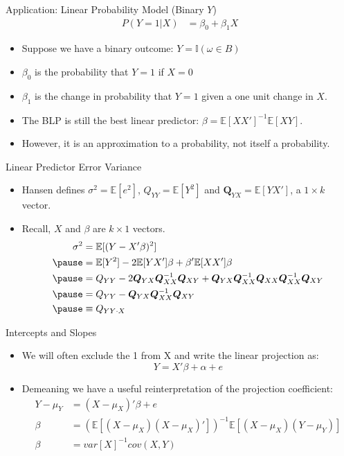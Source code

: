 \documentclass[aspectratio=169, handout, t]{beamer}
\numberwithin{equation}{section}
\begin{document}
\begin{frame}{Application: Linear Probability Model (Binary $Y$)}
\begin{align*}
P(Y=1|X)&=\beta_0+\beta_1X
\end{align*}
\begin{itemize}
\item Suppose we have a binary outcome: $Y=\mathbb{I}(\omega\in B)$
\item $\beta_0$ is the probability that $Y=1$ if $X=0$
\item $\beta_1$ is the change in probability that $Y=1$ given a one unit change in $X$.
\item The BLP is still the best linear predictor: $\beta=\mathbb{E}[XX']^{-1}\mathbb{E}[XY]$.
\item However, it is an approximation to a probability, not itself a probability.
\end{itemize}
\end{frame}


\begin{frame}{Linear Predictor Error Variance}
\begin{itemize}
\item Hansen defines $\sigma^2=\mathbb{E}[e^2]$, $Q_{YY}=\mathbb{E}[Y^2]$ and $\mathbf{Q}_{YX}=\mathbb{E}[YX']$, a $1\times k$ vector.
\item Recall, $X$ and  $\beta$ are $k\times 1$ vectors.
\begin{align*}
\sigma^2&=\mathbb{E}[(Y-X'\beta)^2]\\ \pause
&=\mathbb{E}[Y^2]-2\mathbb{E}[YX']\beta+\beta'\mathbb{E}[XX']\beta\\\pause
&=Q_{YY}-2\bm{Q}_{YX}\bm{Q}^{-1}_{XX}\bm{Q}_{XY}+\bm{Q}_{YX}\bm{Q}^{-1}_{XX}\bm{Q}_{XX}\bm{Q}^{-1}_{XX}\bm{Q}_{XY}\\\pause
&=Q_{YY}-\bm{Q}_{YX}\bm{Q}^{-1}_{XX}\bm{Q}_{XY}\\\pause
&\equiv Q_{YY\cdot X}
\end{align*}
\end{itemize}
\end{frame}

\begin{frame}{Intercepts and Slopes}
\begin{itemize}
\item We will often exclude the 1 from X and write the linear projection as:
$$Y=X'\beta+\alpha+e$$
\item Demeaning we have a useful reinterpretation of the projection coefficient:
\begin{align*}
Y-\mu_Y&=(X-\mu_X)'\beta+e\\
\beta&=(\mathbb{E}[(X-\mu_X)(X-\mu_X)'])^{-1}\mathbb{E}[(X-\mu_X)(Y-\mu_Y)]\\
\beta&=var[X]^{-1}cov(X,Y)\\
\end{align*}
\end{itemize}
\end{frame}
\end{document}
